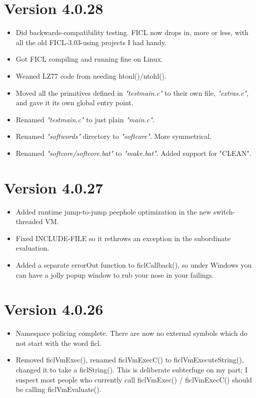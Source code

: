 \section*{Version 4.0.28}
\begin{itemize}[noitemsep]
	\item Did backwards-compatibility testing. FICL now drops in,
	more or less, with all the old FICL-3.03-using projects I had
	handy.

	\item Got FICL compiling and running fine on Linux.

	\item Weaned LZ77 code from needing htonl()/ntohl().

	\item Moved all the primitives defined in \textit{"testmain.c"}
	to their own file, \textit{"extras.c"}, and gave it its own
	global entry point.

	\item Renamed \textit{"testmain.c"} to just plain \textit{"main.c"}.

	\item Renamed \textit{"softwords"} directory to
	\textit{"softcore"}. More symmetrical.

	\item Renamed \textit{"softcore/softcore.bat"} to
	\textit{"make.bat"}. Added support for "CLEAN".
\end{itemize}


\section*{Version 4.0.27}
\begin{itemize}[noitemsep]
	\item Added runtime jump-to-jump peephole optimization in the
	new switch-threaded VM.

	\item Fixed INCLUDE-FILE so it rethrows an exception in the
	subordinate evaluation.

	\item Added a separate errorOut function to ficlCallback(), so
	under Windows you can have a jolly popup window to rub your nose
	in your failings.
\end{itemize}


\section*{Version 4.0.26}
\begin{itemize}[noitemsep]
	\item Namespace policing complete. There are now no external
	symbols which do not start with the word ficl.

	\item Removed ficlVmExec(), renamed ficlVmExecC() to
	ficlVmExecuteString(), changed it to take a ficlString(). This
	is deliberate subterfuge on my part; I suspect most people who
	currently call ficlVmExec() / ficlVmExecC() should be calling
	ficlVmEvaluate().
\end{itemize}


